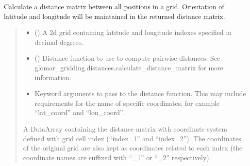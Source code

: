 \documentclass[letterpaper,10pt,english]{sphinxmanual}
\begin{document}
\begin{fulllineitems}
\label{\detokenize{covariance:glomar_gridding.grid.grid_to_distance_matrix}}
\pysigstartsignatures
\pysiglinewithargsret
{}
{\sphinxparamcomma {}\sphinxparamcomma {}}
{}
\pysigstopsignatures
\sphinxAtStartPar
Calculate a distance matrix between all positions in a grid. Orientation of
latitude and longitude will be maintained in the returned distance matrix.
\begin{quote}\begin{description}
\begin{itemize}
\item {}
\sphinxAtStartPar
{} () \textendash{} A 2\sphinxhyphen{}d grid containing latitude and longitude indexes specified in
decimal degrees.

\item {}
\sphinxAtStartPar
{} () \textendash{} Distance function to use to compute pairwise distances. See
glomar\_gridding.distances.calculate\_distance\_matrix for more
information.

\item {}
\sphinxAtStartPar
{} \textendash{} Keyword arguments to pass to the distance function. This may include
requirements for the name of specific coordinates, for example
“lat\_coord” and “lon\_coord”.

\end{itemize}

\sphinxAtStartPar
{} \textendash{} A DataArray containing the distance matrix with coordinate system
defined with grid cell index (“index\_1” and “index\_2”). The coordinates
of the original grid are also kept as coordinates related to each
index (the coordinate names are suffixed with “\_1” or “\_2”
respectively).

\sphinxAtStartPar
{}


\end{description}
\end{quote}
\end{fulllineitems}
\end{document}
